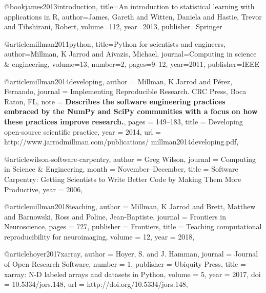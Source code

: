 @book{james2013introduction,
  title={An introduction to statistical learning with applications in R},
  author={James, Gareth and Witten, Daniela and Hastie, Trevor and Tibshirani, Robert},
  volume={112},
  year={2013},
  publisher={Springer}
}

@article{millman2011python,
  title={Python for scientists and engineers},
  author={Millman, K Jarrod and Aivazis, Michael},
  journal={Computing in science \& engineering},
  volume={13},
  number={2},
  pages={9--12},
  year={2011},
  publisher={IEEE}
}

@article{millman2014developing,
  author =        {Millman, K Jarrod and P{\'e}rez, Fernando},
  journal =       {Implementing Reproducible Research. CRC Press, Boca
                   Raton, FL},
  note =          {\newline \textbf{Describes the software engineering
                   practices embraced by the NumPy and SciPy communities
                   with a focus on how these practices improve
                   research.}},
  pages =         {149--183},
  title =         {Developing open-source scientific practice},
  year =          {2014},
  url =           {http://www.jarrodmillman.com/publications/
                   millman2014developing.pdf},
}

@article{wilson-software-carpentry,
  author =        {Greg Wilson},
  journal =       {Computing in Science \& Engineering},
  month =         {November--December},
  title =         {Software Carpentry: Getting Scientists to Write
                   Better Code by Making Them More Productive},
  year =          {2006},
}

@article{millman2018teaching,
  author =        {Millman, K Jarrod and Brett, Matthew and
                   Barnowski, Ross and Poline, Jean-Baptiste},
  journal =       {Frontiers in Neuroscience},
  pages =         {727},
  publisher =     {Frontiers},
  title =         {Teaching computational reproducibility for
                   neuroimaging},
  volume =        {12},
  year =          {2018},
}


@article{hoyer2017xarray,
  author =        {Hoyer, S. and J. Hamman},
  journal =       {Journal of Open Research Software},
  number =        {1},
  publisher =     {Ubiquity Press},
  title =         {xarray: {N-D} labeled arrays and datasets in
                   {Python}},
  volume =        {5},
  year =          {2017},
  doi =           {10.5334/jors.148},
  url =           {http://doi.org/10.5334/jors.148},
}


